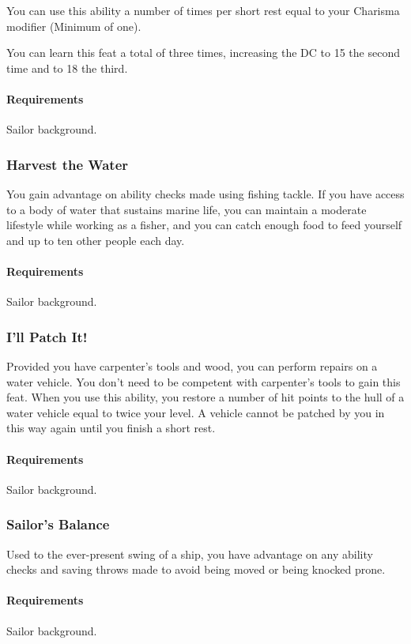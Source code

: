             You can use this ability a number of times per short rest equal to your Charisma modifier (Minimum of one).

            You can learn this feat a total of three times, increasing the DC to 15 the second time and to 18 the third.
            \paragraph{Requirements} Sailor background.
        \subsubsection{Harvest the Water} \label{feat::harvestthewater}
            You gain advantage on ability checks made using fishing tackle.
            If you have access to a body of water that sustains marine life, you can maintain a moderate lifestyle while working as a fisher, and you can catch enough food to feed yourself and up to ten other people each day.
            \paragraph{Requirements} Sailor background.
        \subsubsection{I'll Patch It!} \label{feat::illpatchit}
            Provided you have carpenter's tools and wood, you can perform repairs on a water vehicle.
            You don't need to be competent with carpenter's tools to gain this feat.
            When you use this ability, you restore a number of hit points to the hull of a water vehicle equal to twice your level.
            A vehicle cannot be patched by you in this way again until you finish a short rest.
            \paragraph{Requirements} Sailor background.
        \subsubsection{Sailor's Balance} \label{feat::sailorsbalance}
            Used to the ever-present swing of a ship, you have advantage on any ability checks and saving throws made to avoid being moved or being knocked prone.
            \paragraph{Requirements} Sailor background.
